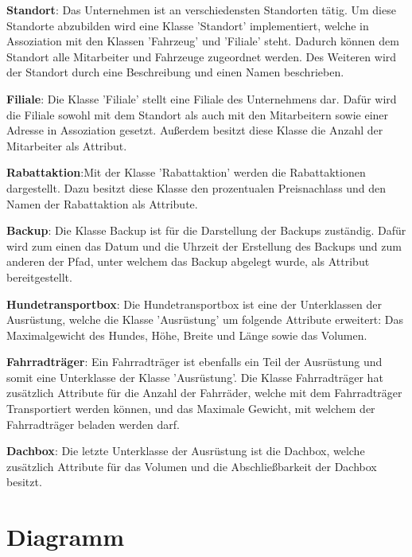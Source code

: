 \textbf{Standort}: Das Unternehmen ist an verschiedensten Standorten tätig. Um diese Standorte abzubilden wird eine Klasse 'Standort' implementiert, welche in Assoziation mit den Klassen 'Fahrzeug' und 'Filiale' steht. Dadurch können dem Standort alle Mitarbeiter und Fahrzeuge zugeordnet werden.
Des Weiteren wird der Standort durch eine Beschreibung und einen Namen beschrieben.

\textbf{Filiale}: Die Klasse 'Filiale' stellt eine Filiale des Unternehmens dar. Dafür wird die Filiale sowohl mit dem Standort als auch mit den Mitarbeitern sowie einer Adresse in Assoziation gesetzt. Außerdem besitzt diese Klasse die Anzahl der Mitarbeiter als Attribut.  

\textbf{Rabattaktion}:Mit der Klasse 'Rabattaktion' werden die Rabattaktionen dargestellt. Dazu besitzt diese Klasse den prozentualen Preisnachlass und den Namen der Rabattaktion als Attribute.

\textbf{Backup}: Die Klasse Backup ist für die Darstellung der Backups zuständig. Dafür wird zum einen das Datum und die Uhrzeit der Erstellung des Backups und zum anderen der Pfad, unter welchem das Backup abgelegt wurde, als Attribut bereitgestellt.

\textbf{Hundetransportbox}: Die Hundetransportbox ist eine der Unterklassen der Ausrüstung, welche die Klasse 'Ausrüstung' um folgende Attribute erweitert: Das Maximalgewicht des Hundes, Höhe, Breite und Länge sowie das Volumen.

\textbf{Fahrradträger}: Ein Fahrradträger ist ebenfalls ein Teil der Ausrüstung und somit eine Unterklasse der Klasse 'Ausrüstung'. Die Klasse Fahrradträger hat zusätzlich Attribute für die Anzahl der Fahrräder, welche mit dem Fahrradträger Transportiert werden können, und das Maximale Gewicht, mit welchem der Fahrradträger beladen werden darf.

\textbf{Dachbox}: Die letzte Unterklasse der Ausrüstung ist die Dachbox, welche zusätzlich Attribute für das Volumen und die Abschließbarkeit der Dachbox besitzt.


\newpage


\section{Diagramm}

